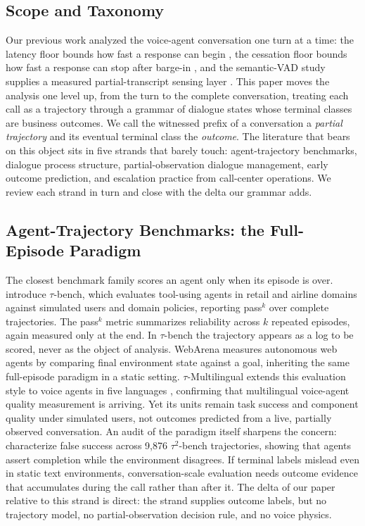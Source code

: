 \subsection{Scope and Taxonomy}

Our previous work analyzed the voice-agent conversation one turn at a time: the latency floor bounds how fast a response can begin \citep{garcia2026latencyfloor}, the cessation floor bounds how fast a response can stop after barge-in \citep{garcia2026cessationfloor}, and the semantic-VAD study supplies a measured partial-transcript sensing layer \citep{garcia2026asking}.
This paper moves the analysis one level up, from the turn to the complete conversation, treating each call as a trajectory through a grammar of dialogue states whose terminal classes are business outcomes.
We call the witnessed prefix of a conversation a \emph{partial trajectory} and its eventual terminal class the \emph{outcome}.
The literature that bears on this object sits in five strands that barely touch: agent-trajectory benchmarks, dialogue process structure, partial-observation dialogue management, early outcome prediction, and escalation practice from call-center operations.
We review each strand in turn and close with the delta our grammar adds.

\subsection{Agent-Trajectory Benchmarks: the Full-Episode Paradigm}

The closest benchmark family scores an agent only when its episode is over.
\citet{sierra2024taubench} introduce $\tau$-bench, which evaluates tool-using agents in retail and airline domains against simulated users and domain policies, reporting pass$^k$ over complete trajectories.
The pass$^k$ metric summarizes reliability across $k$ repeated episodes, again measured only at the end.
In $\tau$-bench the trajectory appears as a log to be scored, never as the object of analysis.
WebArena \citep{webarena2023} measures autonomous web agents by comparing final environment state against a goal, inheriting the same full-episode paradigm in a static setting.
$\tau$-Multilingual extends this evaluation style to voice agents in five languages \citep{tauvoice2026}, confirming that multilingual voice-agent quality measurement is arriving.
Yet its units remain task success and component quality under simulated users, not outcomes predicted from a live, partially observed conversation.
An audit of the paradigm itself sharpens the concern: \citet{falsesuccess2026} characterize false success across 9{,}876 $\tau^2$-bench trajectories, showing that agents assert completion while the environment disagrees.
If terminal labels mislead even in static text environments, conversation-scale evaluation needs outcome evidence that accumulates during the call rather than after it.
The delta of our paper relative to this strand is direct: the strand supplies outcome labels, but no trajectory model, no partial-observation decision rule, and no voice physics.


